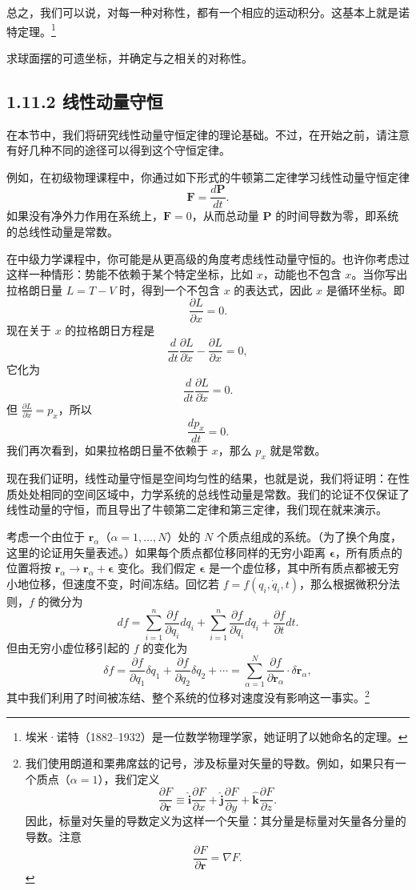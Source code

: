 总之，我们可以说，对每一种对称性，都有一个相应的运动积分。这基本上就是诺特定理。\footnote{埃米·诺特（1882--1932）是一位数学物理学家，她证明了以她命名的定理。}

\begin{exercise}
求球面摆的可遗坐标，并确定与之相关的对称性。
\end{exercise}

\subsection*{1.11.2  线性动量守恒}

在本节中，我们将研究线性动量守恒定律的理论基础。不过，在开始之前，请注意有好几种不同的途径可以得到这个守恒定律。

例如，在初级物理课程中，你通过如下形式的牛顿第二定律学习线性动量守恒定律
$$
\mathbf{F} = \frac{d\mathbf{P}}{dt}.
$$
如果没有净外力作用在系统上，$\mathbf{F} = 0$，从而总动量 $\mathbf{P}$ 的时间导数为零，即系统的总线性动量是常数。

在中级力学课程中，你可能是从更高级的角度考虑线性动量守恒的。也许你考虑过这样一种情形：势能不依赖于某个特定坐标，比如 $x$，动能也不包含 $x$。当你写出拉格朗日量 $L = T - V$ 时，得到一个不包含 $x$ 的表达式，因此 $x$ 是循环坐标。即
$$
\frac{\partial L}{\partial x} = 0.
$$
现在关于 $x$ 的拉格朗日方程是
$$
\frac{d}{dt}\frac{\partial L}{\partial \dot{x}} - \frac{\partial L}{\partial x} = 0,
$$
它化为
$$
\frac{d}{dt}\frac{\partial L}{\partial \dot{x}} = 0.
$$
但 $\frac{\partial L}{\partial \dot{x}} = p_x$，所以
$$
\frac{dp_x}{dt} = 0.
$$
我们再次看到，如果拉格朗日量不依赖于 $x$，那么 $p_x$ 就是常数。

现在我们证明，线性动量守恒是空间均匀性的结果，也就是说，我们将证明：在性质处处相同的空间区域中，力学系统的总线性动量是常数。我们的论证不仅保证了线性动量的守恒，而且导出了牛顿第二定律和第三定律，我们现在就来演示。

考虑一个由位于 $\mathbf{r}_\alpha$（$\alpha = 1, \ldots, N$）处的 $N$ 个质点组成的系统。（为了换个角度，这里的论证用矢量表述。）如果每个质点都位移同样的无穷小距离 $\boldsymbol{\epsilon}$，所有质点的位置将按 $\mathbf{r}_\alpha \to \mathbf{r}_\alpha + \boldsymbol{\epsilon}$ 变化。我们假定 $\boldsymbol{\epsilon}$ 是一个虚位移，其中所有质点都被无穷小地位移，但速度不变，时间冻结。回忆若 $f = f(q_i, \dot{q}_i, t)$，那么根据微积分法则，$f$ 的微分为
$$
df = \sum_{i=1}^{n}\frac{\partial f}{\partial q_i}dq_i + \sum_{i=1}^{n}\frac{\partial f}{\partial \dot{q}_i}d\dot{q}_i + \frac{\partial f}{\partial t}dt.
$$
但由无穷小虚位移引起的 $f$ 的变化为
$$
\delta f = \frac{\partial f}{\partial q_1}\delta q_1 + \frac{\partial f}{\partial q_2}\delta q_2 + \cdots = \sum_{\alpha=1}^{N}\frac{\partial f}{\partial \mathbf{r}_\alpha}\cdot\delta\mathbf{r}_\alpha,
$$
其中我们利用了时间被冻结、整个系统的位移对速度没有影响这一事实。\footnote{我们使用朗道和栗弗席兹的记号，涉及标量对矢量的导数。例如，如果只有一个质点（$\alpha = 1$），我们定义
$$
\frac{\partial F}{\partial \mathbf{r}} \equiv \hat{\mathbf{i}}\frac{\partial F}{\partial x} + \hat{\mathbf{j}}\frac{\partial F}{\partial y} + \hat{\mathbf{k}}\frac{\partial F}{\partial z}.
$$
因此，标量对矢量的导数定义为这样一个矢量：其分量是标量对矢量各分量的导数。注意
$$
\frac{\partial F}{\partial \mathbf{r}} = \nabla F.
$$}

